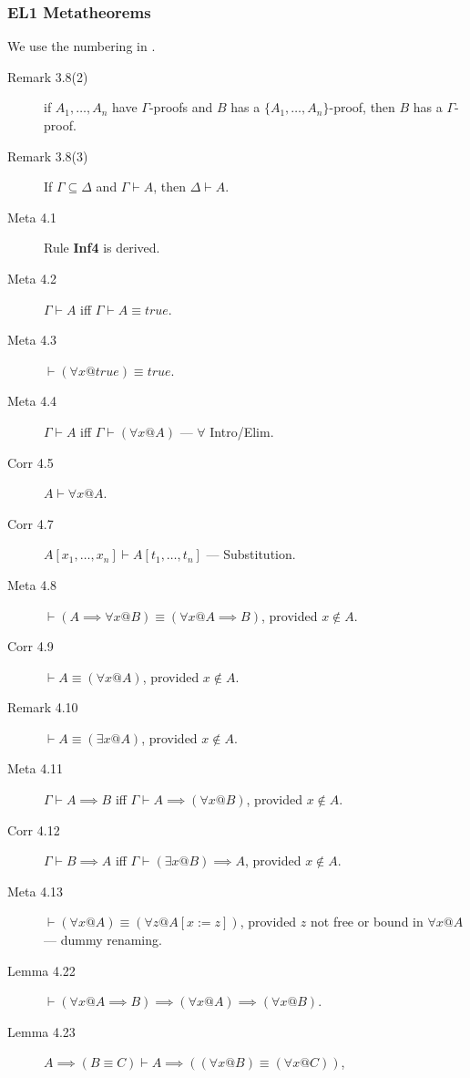 \subsubsection{EL1 Metatheorems}\label{sssec:1EL:meta}

We use the numbering in \cite{journals/logcom/Tourlakis01}.
\begin{description}
  \item[Remark 3.8(2)] if $A_1,\ldots,A_n$ have $\Gamma$-proofs
   and $B$ has a $\{A_1,\ldots,A_n\}$-proof, then $B$ has a $\Gamma$-proof.
  \item[Remark 3.8(3)] If $\Gamma \subseteq \Delta$ and $\Gamma \vdash A$,
  then $\Delta \vdash A$.
  \item[Meta 4.1] Rule \textbf{Inf4} is derived.
  \item[Meta 4.2] $\Gamma \vdash A$ iff $\Gamma \vdash A \equiv true$.
  \item[Meta 4.3] $\vdash (\forall x @ true) \equiv true$.
  \item[Meta 4.4] $\Gamma \vdash A$ iff $\Gamma \vdash (\forall x @ A)$
       --- $\forall$ Intro/Elim.
  \item[Corr 4.5] $A \vdash \forall x @ A$.
  \item[Corr 4.7] $A[x_1,\ldots,x_n] \vdash A[t_1,\ldots,t_n]$
       --- Substitution.
  \item[Meta 4.8]
     $\vdash (A \implies \forall x @ B) \equiv (\forall x @ A \implies B)$,
     provided $x \notin A$.
  \item[Corr 4.9] $\vdash A \equiv (\forall x @ A)$, provided $x \notin A$.
  \item[Remark 4.10] $\vdash A \equiv (\exists x @ A)$, provided $x \notin A$.
  \item[Meta 4.11] $\Gamma \vdash A \implies B$ iff $\Gamma \vdash A \implies (\forall x @ B)$,
    provided $x \notin A$.
  \item[Corr 4.12] $\Gamma \vdash B \implies A$ iff $\Gamma \vdash (\exists x @ B) \implies A$,
    provided $x \notin A$.
  \item[Meta 4.13] $\vdash (\forall x @ A) \equiv (\forall z @ A[x:=z])$,
    provided $z$ not free or bound in $\forall x @ A$
    --- dummy renaming.
  \item[Lemma 4.22] $\vdash (\forall x @ A \implies B)
                            \implies (\forall x @ A)
                            \implies (\forall x @ B)$.
  \item[Lemma 4.23] $A \implies (B \equiv C)
                     \vdash
                     A \implies ((\forall x @ B) \equiv (\forall x @ C))$,

\end{description}
